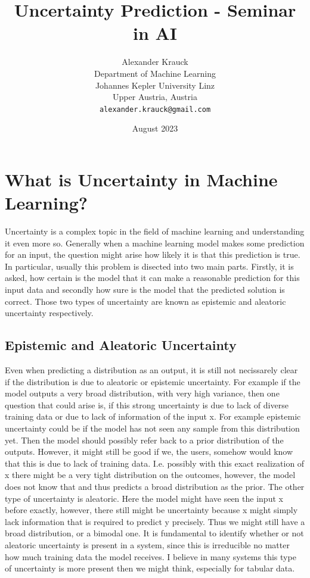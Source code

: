 \documentclass{article}
\title{Uncertainty Prediction - Seminar in AI}
\author{%
  Alexander Krauck \\
  Department of Machine Learning\\
  Johannes Kepler University Linz\\
  Upper Austria, Austria \\
  \texttt{alexander.krauck@gmail.com}
}
\date{August 2023}
\begin{document}
\maketitle

\section{What is Uncertainty in Machine Learning?}
Uncertainty is a complex topic in the field of machine learning and understanding it even more so. Generally when a machine learning model makes some prediction for an input, the question might arise how likely it is that this prediction is true. In particular, usually this problem is disected into two main parts. Firstly, it is asked, how certain is the model that it can make a reasonable prediction for this input data and secondly how sure is the model that the predicted solution is correct. Those two types of uncertainty are known as epistemic and aleatoric uncertainty respectively.

\subsection{Epistemic and Aleatoric Uncertainty} %
Even when predicting a distribution as an output, it is still not necissarely clear if the distribution is due to aleatoric or epistemic uncertainty. For example if the model outputs a very broad distribution, with very high variance, then one question that could arise is, if this strong uncertainty is due to lack of diverse training data or due to lack of information of the input x. For example epistemic uncertainty could be if the model has not seen any sample from this distribution yet. Then the model should possibly refer back to a prior distribution of the outputs. However, it might still be good if we, the users, somehow would know that this is due to lack of training data. I.e. possibly with this exact realization of x there might be a very tight distribution on the outcomes, however, the model does not know that and thus predicts a broad distribution as the prior. The other type of uncertainty is aleatoric. Here the model might have seen the input x before exactly, however, there still might be uncertainty because x might simply lack information that is required to predict y precisely. Thus we might still have a broad distribution, or a bimodal one. It is fundamental to identify whether or not aleatoric uncertainty is present in a system, since this is irreducible no matter how much training data the model receives. I believe in many systems this type of uncertainty is more present then we might think, especially for tabular data.
\end{document}
